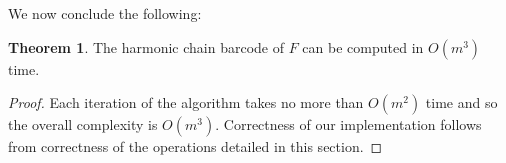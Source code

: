 \documentclass[10pt,a4paper]{amsart}
\newcommand {\mm}[1] {\ifmmode{#1}\else{\mbox{\(#1\)}}\fi}
\newcommand{\Bcal}        {\mm{\mathcal{B}}}
\newcommand{\hcb}{{harmonic chain barcode}}
\theoremstyle{definition}
\newcommand{\filt}{F}
\newcommand{\filtcnt}{m}
\newcommand{\fsimp}{\sigma}
\newcommand{\Chn}{C}
\newcommand{\Bnd}{B}
\newcommand{\Real}{\mathbb{R}}
\newcommand{\aG}{\alpha}
\newcommand{\sG}{\sigma}
\newtheorem{theorem}{Theorem}
\newtheorem{proposition}[theorem]{Proposition}
\theoremstyle{remark}
\begin{document}
\bigskip

We now  conclude the following:

\begin{theorem}
    The \hcb{} of $\filt$ can be computed in $O(\filtcnt^3)$ time.
\end{theorem}

\begin{proof}
Each iteration of the algorithm takes no more than $O(\filtcnt^2)$ time
and so
the overall complexity 
is $O(\filtcnt^3)$.
Correctness of our implementation 
follows from 
correctness of the operations detailed in this section.
\end{proof}




\end{document}
